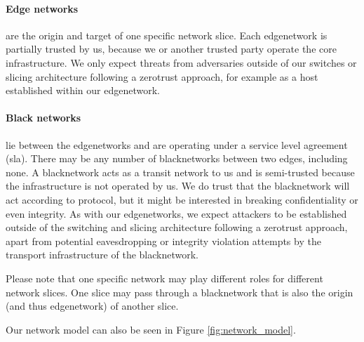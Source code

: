 \paragraph{Edge networks}
are the origin and target of one specific network slice. Each \gls{edgenetwork} is partially trusted by us, because we or another trusted party operate the core infrastructure. We only expect threats from adversaries outside of our switches or slicing architecture following a \gls{zerotrust} approach, for example as a host established within our \gls{edgenetwork}.

\paragraph{Black networks}
lie between the \gls{edgenetwork}s and are operating under a service level agreement (\acrshort{sla}). There may be any number of \gls{blacknetwork}s between two edges, including none. A \gls{blacknetwork} acts as a transit network to us and is semi-trusted because the infrastructure is not operated by us. We do trust that the \gls{blacknetwork} will act according to protocol, but it might be interested in breaking confidentiality or even integrity. As with our \gls{edgenetwork}s, we expect attackers to be established outside of the switching and slicing architecture following a \gls{zerotrust} approach, apart from potential eavesdropping or integrity violation attempts by the transport infrastructure of the \gls{blacknetwork}.

Please note that one specific network may play different roles for different network slices. One slice may pass through a \gls{blacknetwork} that is also the origin (and thus \gls{edgenetwork}) of another slice.

Our network model can also be seen in Figure \ref{fig:network_model}.


